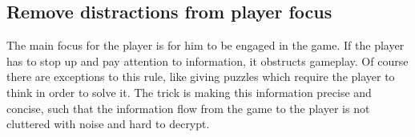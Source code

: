 \subsection{Remove distractions from player focus}
The main focus for the player is for him to be engaged in the game.  If the player has to stop up and pay attention to
information, it obstructs gameplay.  Of course there are exceptions to this rule, like giving puzzles which require the
player to think in order to solve it.  The trick is making this information precise and concise, such that the
information flow from the game to the player is not cluttered with noise and hard to decrypt.
